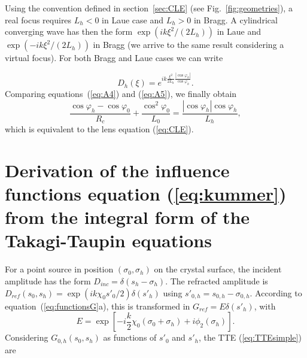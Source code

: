 \documentclass[preprint]{iucr}              %
\newcommand{\inred}[1]{{\color{red}#1}}
\begin{document}
\inred{Using the convention defined in section~\ref{sec:CLE} (see Fig.~\ref{fig:geometries}), a real focus requires $L_h<0$ in Laue case and $L_h>0$ in Bragg. A cylindrical converging wave has then the form $\exp(i k \xi^2 / (2L_h))$ in Laue and $\exp(-i k \xi^2 / (2L_h))$ in Bragg (we arrive to the same result considering a virtual focus). For both Bragg and Laue cases we can write}

\begin{equation}
\label{eq:A5}
D_h(\xi) = e^{i k \frac{\xi^2}{2 L_h}\frac{|\cos\varphi_h|}{\cos\varphi_h}}.   
\end{equation}
 Comparing equations~(\ref{eq:A4}) and (\ref{eq:A5}), we finally obtain
\begin{equation}
    \frac{\cos\varphi_h-\cos\varphi_0}{R_c}+
    \frac{\cos^2\varphi_0}{L_0}=\frac{|\cos\varphi_h|\cos\varphi_h}{L_h},
\end{equation}
which is equivalent to the lens equation (\ref{eq:CLE}).

\section{Derivation of the influence functions \inred{equation (\ref{eq:kummer})} from the integral form of the Takagi-Taupin equations}
\label{appendix:TTEintegral}

\inred{For a point source in position $(\sigma_0,\sigma_h)$ on the crystal surface, the incident amplitude has the form $D_{inc}= \delta(s_h-\sigma_h)$.}
The refracted amplitude is $D_{ref}(s_0,s_h)=\exp(i k \chi_0 s'_0/2)\delta(s'_h)$ \inred{using} $s'_{0,h}=s_{0,h}-\sigma_{0,h}$.
According to equation~(\ref{eq:functionsG}\inred{a}), \inred{this is transformed in $G_{ref}=E \delta(s'_h)$, with}
\begin{equation}
\label{eq:appE}
    E =\exp[-i\frac{k}{2}\chi_0(\sigma_0+\sigma_h)+i \phi_2(\sigma_h)].
\end{equation}
Considering $G_{0,h}(s_0,s_h)$  as functions of $s'_0$ and $s'_h$, the TTE (\ref{eq:TTEsimple}) are
\end{document}
